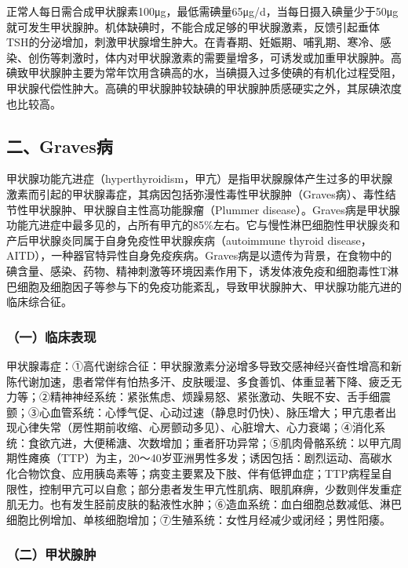 正常人每日需合成甲状腺素100μg，最低需碘量65μg/d，当每日摄入碘量少于50μg就可发生甲状腺肿。机体缺碘时，不能合成足够的甲状腺激素，反馈引起垂体TSH的分泌增加，刺激甲状腺增生肿大。在青春期、妊娠期、哺乳期、寒冷、感染、创伤等刺激时，体内对甲状腺激素的需要量增多，可诱发或加重甲状腺肿。高碘致甲状腺肿主要为常年饮用含碘高的水，当碘摄入过多使碘的有机化过程受阻，甲状腺代偿性肿大。高碘的甲状腺肿较缺碘的甲状腺肿质感硬实之外，其尿碘浓度也比较高。

\protect\hypertarget{text00299.html}{}{}

\subsection{二、Graves病}

甲状腺功能亢进症（hyperthyroidism，甲亢）是指甲状腺腺体产生过多的甲状腺激素而引起的甲状腺毒症，其病因包括弥漫性毒性甲状腺肿（Graves病）、毒性结节性甲状腺肿、甲状腺自主性高功能腺瘤（Plummer
disease）。Graves病是甲状腺功能亢进症中最多见的，占所有甲亢的85\%左右。它与慢性淋巴细胞性甲状腺炎和产后甲状腺炎同属于自身免疫性甲状腺疾病（autoimmune
thyroid
disease，AITD），一种器官特异性自身免疫疾病。Graves病是以遗传为背景，在食物中的碘含量、感染、药物、精神刺激等环境因素作用下，诱发体液免疫和细胞毒性T淋巴细胞及细胞因子等参与下的免疫功能紊乱，导致甲状腺肿大、甲状腺功能亢进的临床综合征。

\subsubsection{（一）临床表现}

甲状腺毒症：①高代谢综合征：甲状腺激素分泌增多导致交感神经兴奋性增高和新陈代谢加速，患者常伴有怕热多汗、皮肤暖湿、多食善饥、体重显著下降、疲乏无力等；②精神神经系统：紧张焦虑、烦躁易怒、紧张激动、失眠不安、舌手细震颤；③心血管系统：心悸气促、心动过速（静息时仍快）、脉压增大；甲亢患者出现心律失常（房性期前收缩、心房颤动多见）、心脏增大、心力衰竭；④消化系统：食欲亢进，大便稀溏、次数增加；重者肝功异常；⑤肌肉骨骼系统：以甲亢周期性瘫痪（TTP）为主，20～40岁亚洲男性多发；诱因包括：剧烈运动、高碳水化合物饮食、应用胰岛素等；病变主要累及下肢、伴有低钾血症；TTP病程呈自限性，控制甲亢可以自愈；部分患者发生甲亢性肌病、眼肌麻痹，少数则伴发重症肌无力。也有发生胫前皮肤的黏液性水肿；⑥造血系统：血白细胞总数减低、淋巴细胞比例增加、单核细胞增加；⑦生殖系统：女性月经减少或闭经；男性阳痿。

\subsubsection{（二）甲状腺肿}


